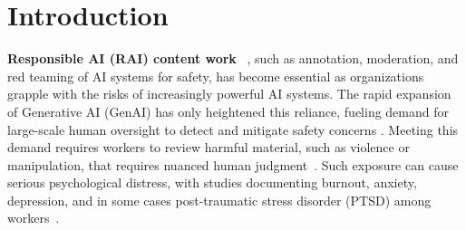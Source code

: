 \section{Introduction}

\textbf{Responsible AI (RAI) content work} ~\cite{qian2025aura}, such as annotation, moderation, and red teaming of AI systems for safety, has become essential as organizations grapple with the risks of increasingly powerful AI systems. The rapid expansion of Generative AI (GenAI) has only heightened this reliance, fueling demand for large-scale human oversight to detect and mitigate safety concerns \cite{StanfordHAI2025AIIndex, GrandViewResearch2024GenerativeAI}. %
Meeting this demand requires workers to review harmful material, such as violence or manipulation, that requires nuanced human judgment~\cite{qian2025aura}. Such exposure can cause serious psychological distress, with studies documenting burnout, anxiety, depression, and in some cases post-traumatic stress disorder (PTSD) among workers~\cite{roberts2016commercial, qian2025aura, alemadi2024emotional, martinez2024secondary, spence2025content, gebrekidan2024content}.

